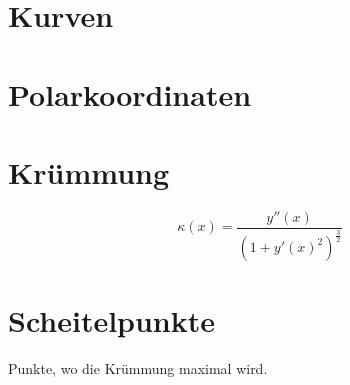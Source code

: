 \section{Kurven}
\section{Polarkoordinaten}
\section{Krümmung}
\[ \boxed{\kappa(x) = \frac{y''(x)}{(1 + y'(x)^2)^{\frac{3}{2}}}} \]

\section{Scheitelpunkte}
Punkte, wo die Krümmung maximal wird. 

